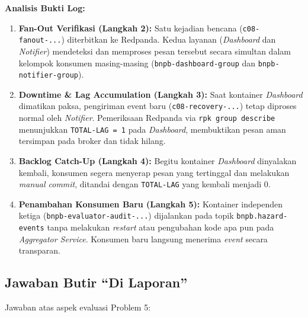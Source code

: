 \noindent\textbf{Analisis Bukti Log:}
\begin{enumerate}
    \item \textbf{Fan-Out Verifikasi (Langkah 2):} Satu kejadian bencana (\texttt{c08-fanout-...}) diterbitkan ke Redpanda. Kedua layanan (\textit{Dashboard} dan \textit{Notifier}) mendeteksi dan memproses pesan tersebut secara simultan dalam kelompok konsumen masing-masing (\texttt{bnpb-}\allowbreak\texttt{dashboard-}\allowbreak\texttt{group} dan \texttt{bnpb-}\allowbreak\texttt{notifier-}\allowbreak\texttt{group}).
    \item \textbf{Downtime \& Lag Accumulation (Langkah 3):} Saat kontainer \textit{Dashboard} dimatikan paksa, pengiriman event baru (\texttt{c08-recovery-...}) tetap diproses normal oleh \textit{Notifier}. Pemeriksaan Redpanda via \texttt{rpk group describe} menunjukkan \texttt{TOTAL-LAG = 1} pada \textit{Dashboard}, membuktikan pesan aman tersimpan pada broker dan tidak hilang.
    \item \textbf{Backlog Catch-Up (Langkah 4):} Begitu kontainer \textit{Dashboard} dinyalakan kembali, konsumen segera menyerap pesan yang tertinggal dan melakukan \textit{manual commit}, ditandai dengan \texttt{TOTAL-LAG} yang kembali menjadi 0.
    \item \textbf{Penambahan Konsumen Baru (Langkah 5):} Kontainer independen ketiga (\texttt{bnpb-}\allowbreak\texttt{evaluator-}\allowbreak\texttt{audit-...}) dijalankan pada topik \texttt{bnpb.hazard-events} tanpa melakukan \textit{restart} atau pengubahan kode apa pun pada \textit{Aggregator Service}. Konsumen baru langsung menerima \textit{event} secara transparan.
\end{enumerate}

\clearpage
\subsection{Jawaban Butir ``Di Laporan''}
\label{subsec:p5_jawaban}
Jawaban atas aspek evaluasi Problem 5:


